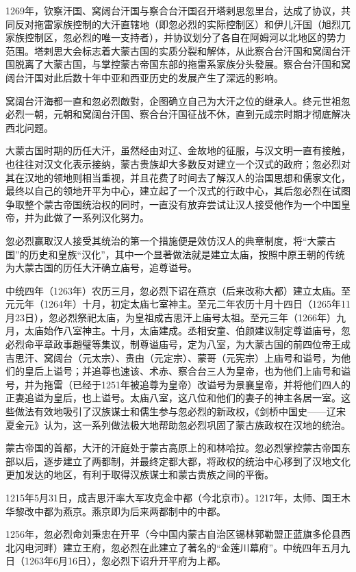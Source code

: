 1269年，钦察汗国、窝阔台汗国与察合台汗国召开塔剌思忽里台，达成了协议，共同反对拖雷家族控制的大汗直辖地（即忽必烈的实际控制区）和伊儿汗国（旭烈兀家族控制区，忽必烈的唯一支持者），并协议划分了各自在阿姆河以北地区的势力范围。塔剌思大会标志着大蒙古国的实质分裂和解体，从此察合台汗国和窝阔台汗国脱离了大蒙古国，与掌控蒙古帝国东部的拖雷系家族分头發展。察合台汗国和窝阔台汗国对此后数十年中亚和西亚历史的发展产生了深远的影响。

窝阔台汗海都一直和忽必烈敵對，企图确立自己为大汗之位的继承人。终元世祖忽必烈一朝，元朝和窝阔台汗国、察合台汗国征战不休，直到元成宗时期才彻底解决西北问题。

大蒙古国时期的历任大汗，虽然经由对辽、金故地的征服，与汉文明一直有接触，也往往对汉文化表示接纳，蒙古贵族却大多数反对建立一个汉式的政府；忽必烈对其在汉地的领地则相当重视，并且花费了时间去了解汉人的治国思想和儒家文化，最终以自己的领地开平为中心，建立起了一个汉式的行政中心，其后忽必烈在试图争取整个蒙古帝国统治权的同时，一直没有放弃尝试让汉人接受他作为一个中国皇帝，并为此做了一系列汉化努力。

忽必烈赢取汉人接受其统治的第一个措施便是效仿汉人的典章制度，将“大蒙古国”的历史和皇族“汉化”，其中一个显著做法就是建立太庙，按照中原王朝的传统为大蒙古国的历任大汗确立庙号，追尊谥号。

中统四年（1263年）农历三月，忽必烈下诏在燕京（后来改称大都）建立太庙。至元元年（1264年）十月，初定太庙七室神主。至元二年农历十月十四日（1265年11月23日），忽必烈祭祀太庙，为皇祖成吉思汗上庙号太祖。至元三年（1266年）九月，太庙始作八室神主。十月，太庙建成。丞相安童、伯颜建议制定尊谥庙号，忽必烈命平章政事趙璧等集议，制尊谥庙号，定为八室，为大蒙古国的前四位帝王成吉思汗、窝阔台（元太宗）、贵由（元定宗）、蒙哥（元宪宗）上庙号和谥号，为他们的皇后上谥号；并追尊也速该、术赤、察合台三人为皇帝，也为他们上庙号和谥号，并为拖雷（已经于1251年被追尊为皇帝）改谥号为景襄皇帝，并将他们四人的正妻追谥为皇后，也上谥号。太庙八室，这八位和他们的妻子的神主各居一室。这些做法有效地吸引了汉族谋士和儒生参与忽必烈的新政权，《剑桥中国史——辽宋夏金元》认为，这一系列做法极大地帮助忽必烈巩固了蒙古族政权在汉地的统治。

蒙古帝国的首都，大汗的汗庭处于蒙古高原上的和林哈拉。忽必烈掌控蒙古帝国东部以后，逐步建立了两都制，并最终定都大都，将政权的统治中心移到了汉地文化更加发达的地区，有利于取得汉族谋士和蒙古贵族之间的平衡。

1215年5月31日，成吉思汗率大军攻克金中都（今北京市）。1217年，太师、国王木华黎改中都为燕京。燕京即为后来两都制中的中都。

1256年，忽必烈命刘秉忠在开平（今中国内蒙古自治区锡林郭勒盟正蓝旗多伦县西北闪电河畔）建立王府，忽必烈在此建立了著名的“金莲川幕府”。中统四年五月九日（1263年6月16日），忽必烈下诏升开平府为上都。

